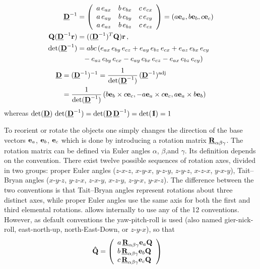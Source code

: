 \begin{align}
{\underline{\bf D}}^{-1} &=
\left(
\begin{array}{ccc}
a\, e_{ax} & b\, e_{bx} & c\, e_{cx} \\
a\, e_{ay} & b\, e_{by} & c\, e_{cy} \\
a\, e_{az} & b\, e_{bz} & c\, e_{cz} \\
\end{array}
\right) = (a{\bf e}_a,b{\bf e}_b,c{\bf e}_c)\\
 {\bf Q}({\underline{\bf D}}^{-1}{\bf r}) &= (({\underline{\bf D}}^{-1})^T{\bf Q}){\bf r} \,\mbox{,}\\
\det({\underline{\bf D}}^{-1}) &= abc\,
( e_{ax}\, e_{by}\, e_{cz}
+ e_{ay}\, e_{bz}\, e_{cx}
+ e_{az}\, e_{bx}\, e_{cy} \nonumber \\
&\phantom{=} - e_{az}\, e_{by}\, e_{cx}
   - e_{ay}\, e_{bx}\, e_{cz}
   - e_{ax}\, e_{bz}\, e_{cy}) \label{eq:detDm1}
\end{align}
\begin{align}
{\underline{\bf D}} &= ({\underline{\bf D}}^{-1})^{-1} = \frac{1}{\det({\underline{\bf D}}^{-1})}\,
          ({\underline{\bf D}}^{-1})^{\rm adj} \nonumber \\
&= \frac{1}{\det({\underline{\bf D}}^{-1})} \, (b{\bf e}_b\times c{\bf e}_c,-a{\bf e}_a
\times c{\bf e}_c,a{\bf e}_a\times b{\bf e}_b)
\end{align}
whereas $\det(\M{D}) \, \det(\M{D}^{-1}) = \det(\M{D}\, \M{D}^{-1}) =\det(\idty) = 1$

To reorient or rotate the objects one simply changes the  direction of the base vectors ${\bf e}_a$, ${\bf e}_b$, ${\bf e}_c$ which is done by introducing a rotation matrix ${\underline{\bf R}}_{\alpha\beta\gamma}$. The rotation matrix can be defined via Euler angles $\alpha$, $\beta$,and $\gamma$. Its definition depends on the convention. There exist twelve possible sequences of rotation axes, divided in two groups: proper Euler angles ($z$-$x$-$z$, $x$-$y$-$x$, $y$-$z$-$y$, $z$-$y$-$z$, $x$-$z$-$x$, $y$-$x$-$y$),
Tait–Bryan angles ($x$-$y$-$z$, $y$-$z$-$x$, $z$-$x$-$y$, $x$-$z$-$y$, $z$-$y$-$x$, $y$-$x$-$z$). The difference between the two conventions is that Tait–Bryan angles represent rotations about three distinct axes, while proper Euler angles use the same axis for both the first and third elemental rotations. \SASfit allows internally to use any of the 12 conventions. However, as default conventions the yaw-pitch-roll is used (also named gier-nick-roll, east-north-up, north-East-Down, or $z$-$y$-$x$),  so that
\begin{align}
\displaystyle {\bf\hat{Q}} &=
  \left( \begin{array}{l} a\,{\underline{\bf R}}_{\alpha\beta\gamma}{\bf e}_a{\bf Q}\\
                          b\,{\underline{\bf R}}_{\alpha\beta\gamma}{\bf e}_b{\bf Q}\\
                          c\,{\underline{\bf R}}_{\alpha\beta\gamma}{\bf e}_c{\bf Q}
\end{array}\right)
\label{eq:Q:dach}
\end{align}
\vspace{5mm}

